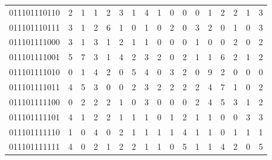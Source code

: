 \documentclass[10pt,a4paper]{article}
\begin{document}
\begin{longtable}{ |c|c|c|c|c|c|c|c|c|c|c|c|c|c|c|c|c| }
    011101110110              & 2                            & 1                                & 1                            & 2                              & 3   & 1   & 4   & 1   & 0   & 0   & 0   & 1   & 2   & 2   & 1   & 3   \\
    011101110111              & 3                            & 1                                & 2                            & 6                              & 1   & 0   & 1   & 0   & 2   & 0   & 3   & 2   & 0   & 1   & 0   & 3   \\
    011101111000              & 3                            & 1                                & 3                            & 1                              & 2   & 1   & 1   & 0   & 0   & 0   & 1   & 0   & 0   & 2   & 0   & 2   \\
    011101111001              & 5                            & 7                                & 3                            & 1                              & 4   & 2   & 3   & 2   & 0   & 2   & 1   & 1   & 6   & 2   & 1   & 2   \\
    011101111010              & 0                            & 1                                & 4                            & 2                              & 0   & 5   & 4   & 0   & 3   & 2   & 0   & 9   & 2   & 0   & 0   & 0   \\
    011101111011              & 4                            & 5                                & 3                            & 0                              & 0   & 2   & 3   & 2   & 2   & 2   & 2   & 4   & 7   & 1   & 0   & 2   \\
    011101111100              & 0                            & 2                                & 2                            & 2                              & 1   & 0   & 3   & 0   & 0   & 0   & 2   & 4   & 5   & 3   & 1   & 2   \\
    011101111101              & 4                            & 1                                & 2                            & 2                              & 1   & 1   & 1   & 0   & 1   & 2   & 1   & 1   & 0   & 0   & 3   & 3   \\
    011101111110              & 1                            & 0                                & 4                            & 0                              & 2   & 1   & 1   & 1   & 1   & 4   & 1   & 1   & 0   & 1   & 1   & 1   \\
    011101111111              & 4                            & 0                                & 2                            & 1                              & 2   & 2   & 1   & 1   & 0   & 5   & 1   & 1   & 4   & 2   & 0   & 5   \\

\end{longtable}
\end{document}
